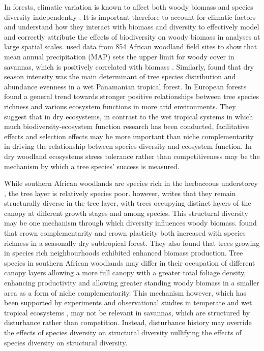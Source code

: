 \documentclass[11pt,a4paper]{article}
\begin{document}
In forests, climatic variation is known to affect both woody biomass \citep{Michaletz2014, Michaletz2018} and species diversity independently \citep{Spasojevic2014}. It is important therefore to account for climatic factors and understand how they interact with biomass and diversity to effectively model and correctly attribute the effects of biodiversity on woody biomass in analyses at large spatial scales. \citet{Sankaran2005} used data from 854 African woodland field sites to show that mean annual precipitation (MAP) sets the upper limit for woody cover in savannas, which is positively correlated with biomass \citep{Chisholm2013, Prado-Junior2016}. Similarly, \citet{Condit2013} found that dry season intensity was the main determinant of tree species distribution and abundance evenness in a wet Panamanian tropical forest. In European forests \citep{Ratcliffe2017} found a general trend towards stronger positive relationships between tree species richness and various ecosystem functions in more arid environments. They suggest that in dry ecosystems, in contrast to the wet tropical systems in which much biodiversity-ecosystem function research has been conducted, facilitative effects and selection effects may be more important than niche complementarity in driving the relationship between species diversity and ecosystem function. In dry woodland ecosystems stress tolerance rather than competitiveness may be the mechanism by which a tree species' success is measured.



While southern African woodlands are species rich in the herbaceous understorey \citep{Murphy2016}, the tree layer is relatively species poor. \citet{Solbrig1996} however, writes that they remain structurally diverse in the tree layer, with trees occupying distinct layers of the canopy at different growth stages and among species. This structural diversity may be one mechanism through which diversity influences woody biomass. \citep{Kunz2019} found that crown complementarity and crown plasticity both increased with species richness in a seasonally dry subtropical forest. They also found that trees growing in species rich neighbourhoods exhibited enhanced biomass production. Tree species in southern African woodlands may differ in their occupation of different canopy layers allowing a more full canopy with a greater total foliage density, enhancing productivity and allowing greater standing woody biomass in a smaller area as a form of niche complementarity. This mechanism however, which has been supported by experiments and observational studies in temperate and wet tropical ecosystems \citep{Hardiman2011, Stark2012}, may not be relevant in savannas, which are structured by disturbance rather than competition. Instead, disturbance history may override the effects of species diversity on structural diversity nullifying the effects of species diversity on structural diversity.
\end{document}

